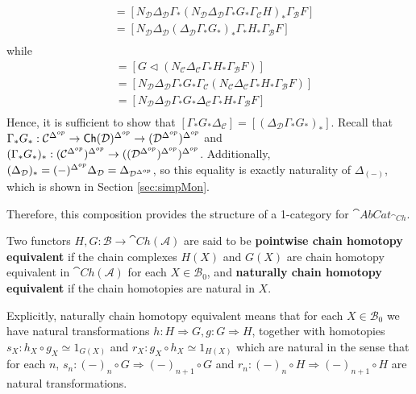 \begin{enumerate}
\begin{align*}
        &= [N_\mathcal{D}\Delta_\mathcal{D}\Gamma_*(N_\mathcal{D}\Delta_\mathcal{D}\Gamma_*G_*\Gamma_\mathcal{C}H)_*\Gamma_\mathcal{B}F] \\
        &= [N_\mathcal{D}\Delta_\mathcal{D}(\Delta_\mathcal{D}\Gamma_*G_*)_*\Gamma_*H_*\Gamma_\mathcal{B}F] \\
    \end{align*}
    while
    \begin{align*}
        [G\lhd(H\lhd F)] &= [G\lhd(N_\mathcal{C}\Delta_\mathcal{C}\Gamma_*H_*\Gamma_\mathcal{B}F)] \\
        &= [N_\mathcal{D}\Delta_\mathcal{D}\Gamma_*G_*\Gamma_\mathcal{C}(N_\mathcal{C}\Delta_\mathcal{C}\Gamma_*H_*\Gamma_\mathcal{B}F)] \\
        &= [N_\mathcal{D}\Delta_\mathcal{D}\Gamma_*G_*\Delta_\mathcal{C}\Gamma_*H_*\Gamma_\mathcal{B}F] \\
    \end{align*}
    Hence, it is sufficient to show that $[\Gamma_*G_*\Delta_\mathcal{C}] = [(\Delta_\mathcal{D}\Gamma_*G_*)_*]$. Recall that $\Gamma_*G_* : \mathcal{C}^{\Delta^{op}} \rightarrow \textup{\textsf{Ch}}(\mathcal{D})^{\Delta^{op}}\rightarrow (\mathcal{D}^{\Delta^{op}})^{\Delta^{op}}$ and $(\Gamma_*G_*)_* : (\mathcal{C}^{\Delta^{op}})^{\Delta^{op}}\rightarrow ((\mathcal{D}^{\Delta^{op}})^{\Delta^{op}})^{\Delta^{op}}$. Additionally, $(\Delta_\mathcal{D})_* = (-)^{\Delta^{op}}\Delta_\mathcal{D} = \Delta_{\mathcal{D}^{\Delta^{op}}}$, so this equality is exactly naturality of $\Delta_{(-)}$, which is shown in Section \ref{sec:simpMon}.
\end{enumerate}
Therefore, this composition provides the structure of a 1-category for $\cat{AbCat}_{\cat{Ch}}$.


\begin{defn}[label=defn:ChEquiv]{}
    Two functors $H,G:\mathcal{B}\rightarrow \cat{Ch}(\mathcal{A})$ are said to be \textbf{pointwise chain homotopy equivalent} if the chain complexes $H(X)$ and $G(X)$ are chain homotopy equivalent in $\cat{Ch}(\mathcal{A})$ for each $X \in \mathcal{B}_0$, and \textbf{naturally chain homotopy equivalent} if the chain homotopies are natural in $X$.

    Explicitly, naturally chain homotopy equivalent means that for each $X \in \mathcal{B}_0$ we have natural transformations $h:H\Rightarrow G, g:G\Rightarrow H$, together with homotopies $s_X:h_X\circ g_X\simeq 1_{G(X)}$ and $r_X:g_X\circ h_X\simeq 1_{H(X)}$ which are natural in the sense that for each $n$, $s_n:(-)_n\circ G\Rightarrow (-)_{n+1}\circ G$ and $r_n:(-)_n\circ H\Rightarrow (-)_{n+1}\circ H$ are natural transformations.
\end{defn}


